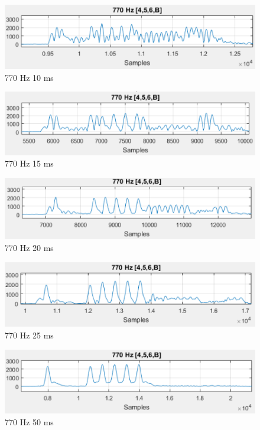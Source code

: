 \begin{figure}[h]
\centering
\includegraphics[scale=0.8]{Billeder/Speed10ms.PNG}
\caption{770 Hz 10 ms}
\label{fig:10ms}
\end{figure} 

\begin{figure}[h]
\centering
\includegraphics[scale=0.8]{Billeder/Speed15ms.PNG}
\caption{770 Hz 15 ms}
\label{fig:15ms}
\end{figure} 

\begin{figure}[h]
\centering
\includegraphics[scale=0.8]{Billeder/Speed20ms.PNG}
\caption{770 Hz 20 ms}
\label{fig:20ms}
\end{figure} 

\begin{figure}[h]
\centering
\includegraphics[scale=0.8]{Billeder/Speed25ms.PNG}
\caption{770 Hz 25 ms}
\label{fig:25ms}
\end{figure} 

\begin{figure}[h]
\centering
\includegraphics[scale=0.8]{Billeder/Speed50ms.PNG}
\caption{770 Hz 50 ms}
\label{fig:50ms}
\end{figure} 

